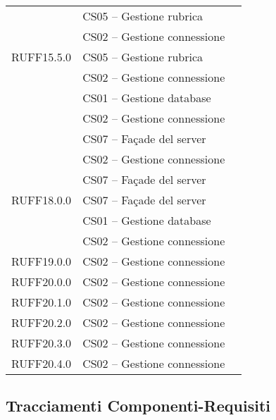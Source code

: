 \begin{center}
\begin{longtable}{lp{}l}
 & CS05 -- Gestione rubrica \\
 & CS02 -- Gestione connessione \\
RUFF15.5.0 & CS05 -- Gestione rubrica \\
 & CS02 -- Gestione connessione \\
 & CS01 -- Gestione database \\
 & CS02 -- Gestione connessione \\
 & CS07 -- Façade del server \\
 & CS02 -- Gestione connessione \\
 & CS07 -- Façade del server \\
RUFF18.0.0 & CS07 -- Façade del server \\
 & CS01 -- Gestione database \\
 & CS02 -- Gestione connessione \\
RUFF19.0.0 & CS02 -- Gestione connessione \\
RUFF20.0.0 & CS02 -- Gestione connessione \\
RUFF20.1.0 & CS02 -- Gestione connessione \\
RUFF20.2.0 & CS02 -- Gestione connessione \\
RUFF20.3.0 & CS02 -- Gestione connessione \\
RUFF20.4.0 & CS02 -- Gestione connessione \\
\bottomrule
\end{longtable}
\end{center}
\subsection{Tracciamenti Componenti-Requisiti}\label{sec:tracCompRec}

